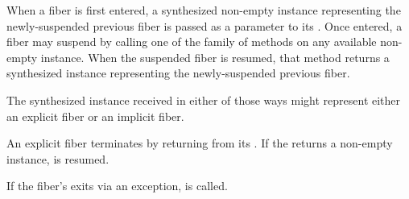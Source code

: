 \para When a fiber is first entered, a synthesized non-empty \fiber instance
representing the newly-suspended previous fiber is passed as a parameter to
its \entryfn. Once entered, a fiber may suspend by calling one of the \resume
family of methods on any available non-empty \fiber instance. When the
suspended fiber is resumed, that method returns a synthesized \fiber instance
representing the newly-suspended previous fiber.

\para The synthesized \fiber instance received in either of those ways might
represent either an explicit fiber or an implicit fiber.

\para An explicit fiber terminates by returning from its \entryfn. If the \entryfn
returns a non-empty \fiber instance,  is resumed.



\para If the fiber's \entryfn exits via an exception,  is called.



